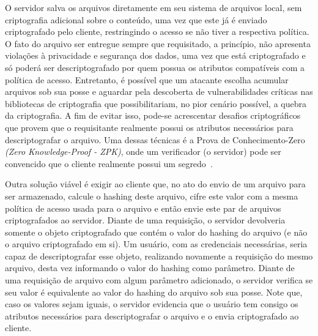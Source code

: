 \documentclass[a4paper,11pt]{article}
\begin{document}
O servidor salva os arquivos diretamente em seu sistema de arquivos local, sem criptografia adicional sobre o conteúdo, uma vez que este já é enviado criptografado pelo cliente, restringindo o acesso se não tiver a respectiva política.
O fato do arquivo ser entregue sempre que requisitado, a princípio, não apresenta violações à privacidade e segurança dos dados, uma vez que está criptografado e só poderá ser descriptografado por quem possua os atributos compatíveis com a política de acesso.
Entretanto, é possível que um atacante escolha acumular arquivos sob sua posse e aguardar pela descoberta de vulnerabilidades críticas nas bibliotecas de criptografia que possibilitariam, no pior cenário possível, a quebra da criptografia.
A fim de evitar isso, pode-se acrescentar desafios criptográficos que provem que o requisitante realmente possui os atributos necessários para descriptografar o arquivo.
Uma dessas técnicas é a Prova de Conhecimento-Zero \emph{(Zero Knowledge-Proof - ZPK)}, onde um verificador (o servidor) pode ser convencido que o cliente realmente possui um segredo~\cite{Rice2010,Buchanan2017}.


Outra solução viável é exigir ao cliente que, no ato do envio de um arquivo para ser armazenado, calcule o hashing deste arquivo, cifre este valor com a mesma política de acesso usada para o arquivo e então envie este par de arquivos criptografados ao servidor.
Diante de uma requisição, o servidor devolveria somente o objeto criptografado que contém o valor do hashing do arquivo (e não o arquivo criptografado em si).
Um usuário, com as credenciais necessárias, seria capaz de descriptografar esse objeto, realizando novamente a requisição do mesmo arquivo, desta vez informando o valor do hashing como parâmetro.
Diante de uma requisição de arquivo com algum parâmetro adicionado, o servidor verifica se seu valor é equivalente ao valor do hashing do arquivo sob sua posse. Note que, caso os valores sejam iguais, o servidor evidencia que o usuário tem consigo os atributos necessários para descriptografar o  arquivo e o envia criptografado ao cliente.
\end{document}
